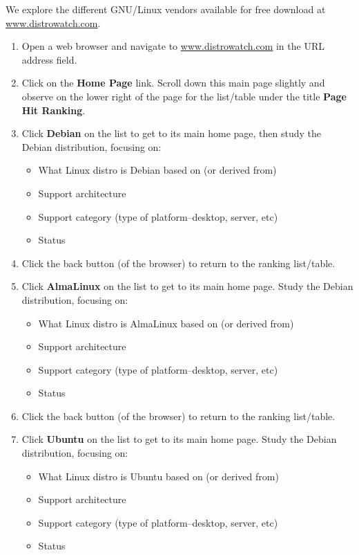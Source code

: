 We explore the different GNU/Linux vendors available for free download at {\url{www.distrowatch.com}}. 

\begin{enumerate}
\item Open a web browser and navigate to {\url{www.distrowatch.com}} in the URL address field. 
\item Click on the {\bf{Home Page}} link. Scroll down this main page slightly and observe on the lower right of the page for the list/table under the title {\bf{Page Hit Ranking}}. 
\item Click {\bf{Debian}} on the list to get to its main home page, then study the Debian distribution, focusing on: 

\begin{itemize} 
    \item What Linux distro is Debian based on (or derived from) 
    \item Support architecture
    \item Support category (type of platform--desktop, server, etc)
    \item Status 
\end{itemize} 

\item Click the back button (of the browser) to return to the ranking list/table.

\item Click {\bf{AlmaLinux}} on the list to get to its main home page. Study the Debian distribution, focusing on:

\begin{itemize} 
    \item What Linux distro is AlmaLinux based on (or derived from)
    \item Support architecture
    \item Support category (type of platform--desktop, server, etc)
    \item Status 
\end{itemize} 

\item Click the back button (of the browser) to return to the ranking list/table.

\item Click {\bf{Ubuntu}} on the list to get to its main home page. Study the Debian distribution, focusing on:

\begin{itemize} 
    \item What Linux distro is Ubuntu based on (or derived from)
    \item Support architecture
    \item Support category (type of platform--desktop, server, etc)
    \item Status 
\end{itemize} 

\end{enumerate}
